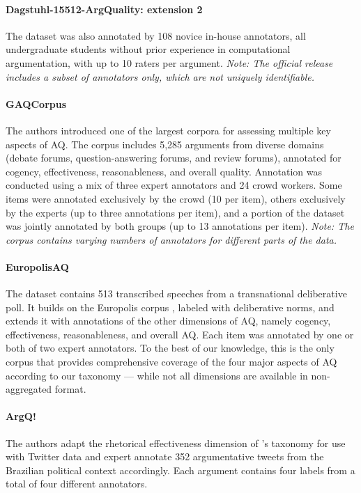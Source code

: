 \paragraph{Dagstuhl-15512-ArgQuality: extension 2 \cite{mirzakhmedova2024reliable}}
The dataset was also annotated by 108 novice in-house annotators, all undergraduate students without prior experience in computational argumentation, with up to 10 raters per argument.
\textit{Note: The official release includes a subset of annotators only, which are not uniquely identifiable.}

\paragraph{GAQCorpus \cite{lauscher-etal-2020-rhetoric}}
The authors introduced one of the largest corpora for assessing multiple key aspects of AQ. The corpus includes 5,285 arguments from diverse domains (debate forums, question-answering forums, and review forums), annotated for cogency, effectiveness, reasonableness, and overall quality. Annotation was conducted using a mix of three expert annotators and 24 crowd workers. Some items were annotated exclusively by the crowd (10 per item), others exclusively by the experts (up to three annotations per item), and a portion of the dataset was jointly annotated by both groups (up to 13 annotations per item).
\textit{Note: The corpus contains varying numbers of annotators for different parts of the data.}

\paragraph{EuropolisAQ \cite{falk-lapesa-2022-scaling}}
The dataset contains 513 transcribed speeches from a transnational deliberative poll. It builds on the Europolis corpus \cite{Gerber_Baechtiger_Shikano_Reber_Rohr_2018}, labeled with deliberative norms, and extends it with annotations of the other dimensions of AQ, namely cogency, effectiveness, reasonableness, and overall AQ. Each item was annotated by one or both of two expert annotators. To the best of our knowledge, this is the only corpus that provides comprehensive coverage of the four major aspects of AQ according to our taxonomy --- while not all dimensions are available in non-aggregated format.

\paragraph{ArgQ! \cite{silva2021quality}}
The authors adapt the rhetorical effectiveness dimension of \citet{wachsmuth-etal-2017-computational}'s taxonomy for use with Twitter data and expert annotate 352 argumentative tweets from the Brazilian political context accordingly. Each argument contains four labels from a total of four different annotators.

